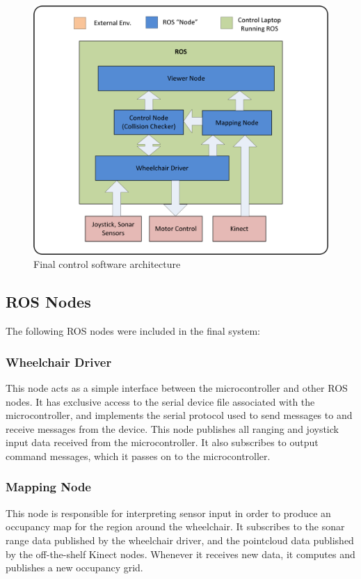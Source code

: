 \documentclass[oneside,final,a4paper]{report}
\begin{document}
\begin{figure}[hbt]
 \centering
 \includegraphics[scale=0.8]{FYDP_Software_Diagram}
 \caption{Final control software architecture}
 \label{final_arch}
\end{figure}


\subsection{ROS Nodes}
The following ROS nodes were included in the final system:

\subsubsection{Wheelchair Driver} 
This node acts as a simple interface between the microcontroller and other ROS nodes.  It has exclusive access to the serial device file associated with the microcontroller, and implements the serial protocol used to send messages to and receive messages from the device.  This node publishes all ranging and joystick input data received from the microcontroller.  It also subscribes to output command messages, which it passes on to the microcontroller.

\subsubsection{Mapping Node} 
This node is responsible for interpreting sensor input in order to produce an occupancy map for the region around the wheelchair.  It subscribes to the sonar range data published by the wheelchair driver, and the pointcloud data published by the off-the-shelf Kinect nodes.  Whenever it receives new data, it computes and publishes a new occupancy grid.
\end{document}
